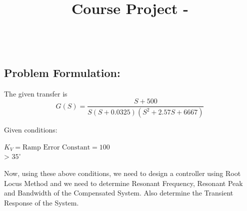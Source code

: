 \documentclass[12pt]{article}
\title{ 
  {\Large \textbf{\MakeUppercase{\projectTitle{}}}} \\
  {\large Course Project - \courseID} \vspace{-1em}
}
\author{
  {\large \studentName} \\
  {\large \studentRollNo}
}
\date{}
\begin{document}
\maketitle
\thispagestyle{fancy}

\subsection*{Problem Formulation:}
The given transfer is
\begin{equation}
  G(S) = \frac{S+500}{S(S+0.0325)(S^2 + 2.57S + 6667)}
\end{equation}

Given conditions:
\begin{center}
  \(K_V = \text{Ramp Error Constant} = 100 \) \\
   > \(35^\circ \)
\end{center}

Now, using these above conditions, we need to design a controller using Root Locus Method and we need to determine Resonant Frequency, Resonant Peak and Bandwidth of the Compensated System. Also determine the Transient Response of the System.
\end{document}
